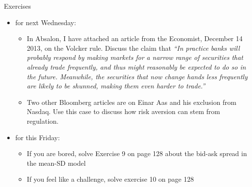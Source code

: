 \documentclass[english,10pt]{beamer}
\begin{document}
\begin{frame}{Exercises}
	\begin{itemize}
		\item for next Wednesday:
		\begin{itemize}
			\item In Absalon, I have attached an article from the Economist, December 14 2013, on the Volcker rule. Discuss the claim that \emph{``In practice banks will probably respond by making markets for a narrow range of securities that already trade frequently, and thus might reasonably be expected to do so in the future. Meanwhile, the securities that now change hands less frequently are likely to be shunned, making them even harder to trade.''}
			\item Two other Bloomberg articles are on Einar Aas and his exclusion from Nasdaq. Use this case to discuss how risk aversion can stem from regulation.
		\end{itemize}
		\item for this Friday:
		\begin{itemize}
			\item If you are bored, solve Exercise 9 on page 128 about the bid-ask spread in the mean-SD model
			\item If you feel like a challenge, solve exercise 10 on page 128
		\end{itemize}
	\end{itemize}
\end{frame}
\end{document}
